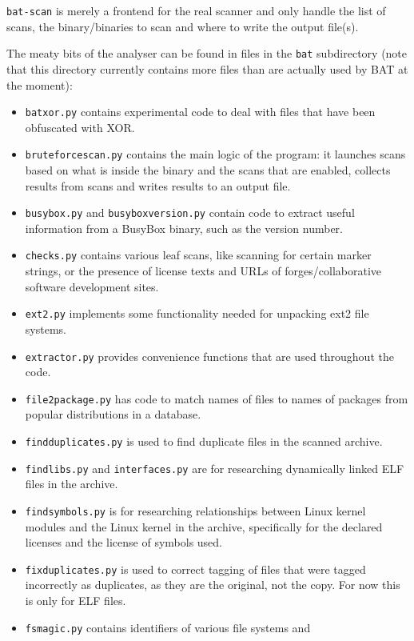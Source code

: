 \documentclass[10pt,a4paper]{article}
\begin{document}
\texttt{bat-scan} is merely a frontend for the real scanner and only handle
the list of scans, the binary/binaries to scan and where to write the output
file(s).

The meaty bits of the analyser can be found in files in the \texttt{bat}
subdirectory (note that this directory currently contains more files than are
actually used by BAT at the moment):

\begin{itemize}
\item \texttt{batxor.py} contains experimental code to deal with files that
have been obfuscated with XOR.
\item \texttt{bruteforcescan.py} contains the main logic of the program: it
launches scans based on what is inside the binary and the scans that are
enabled, collects results from scans and writes results to an output file.
\item \texttt{busybox.py} and \texttt{busyboxversion.py} contain code to
extract useful information from a BusyBox binary, such as the version number.
\item \texttt{checks.py} contains various leaf scans, like scanning for certain
marker strings, or the presence of license texts and URLs of
forges/collaborative software development sites.
\item \texttt{ext2.py} implements some functionality needed for unpacking ext2
file systems.
\item \texttt{extractor.py} provides convenience functions that are used
throughout the code.
\item \texttt{file2package.py} has code to match names of files to names of
packages from popular distributions in a database.
\item \texttt{findduplicates.py} is used to find duplicate files in the scanned
archive.
\item \texttt{findlibs.py} and \texttt{interfaces.py} are for researching
dynamically linked ELF files in the archive.
\item \texttt{findsymbols.py} is for researching relationships between Linux
kernel modules and the Linux kernel in the archive, specifically for the
declared licenses and the license of symbols used.
\item \texttt{fixduplicates.py} is used to correct tagging of files that were
tagged incorrectly as duplicates, as they are the original, not the copy. For
now this is only for ELF files.
\item \texttt{fsmagic.py} contains identifiers of various file systems and

\end{itemize}
\end{document}

